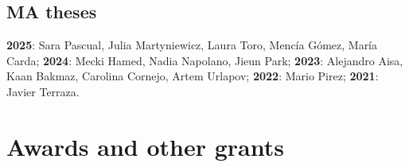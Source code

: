 \documentclass[a4paper, 12pt]{article}
\begin{document}
\subsection*{MA theses}

\textbf{2025}: Sara Pascual, Julia Martyniewicz, Laura Toro, Mencía Gómez, María Carda;
\textbf{2024}: Mecki Hamed, Nadia Napolano, Jieun Park;
\textbf{2023}: Alejandro Aisa, Kaan Bakmaz, Carolina Cornejo, Artem Urlapov;
\textbf{2022}: Mario Pirez;
\textbf{2021}: Javier Terraza.

\section*{Awards and other grants}

\end{document}
